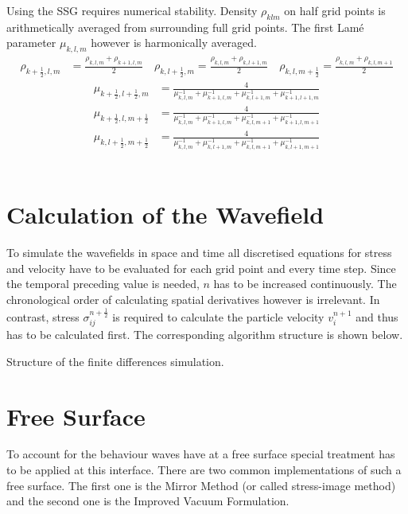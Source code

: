 \documentclass[pdftex,a4paper,parskip,listof=totoc,bibliography=totoc,onehalfspacing,12pt]{scrreprt}
\begin{document}
Using the SSG  requires numerical stability. Density $\rho_{klm}$ on half grid points is arithmetically averaged from surrounding full grid points. The first Lam\'{e} parameter $\mu_{k,l,m}$ however is harmonically averaged. 
\begin{align*}
	\rho_{k+\frac{1}{2},l,m} &= \frac{\rho_{k,l,m} + \rho_{k+1,l,m}}{2} \quad \rho_{k,l+\frac{1}{2},m} = \frac{\rho_{k,l,m} + \rho_{k,l+1,m}}{2} \quad \rho_{k,l,m+\frac{1}{2}} = \frac{\rho_{k,l,m} + \rho_{k,l,m+1}}{2}
\end{align*}
\begin{align*}
	\mu_{k+\frac{1}{2},l+\frac{1}{2},m} &= \frac{4}{\mu^{-1}_{k,l,m} + \mu^{-1}_{k+1,l,m} + \mu^{-1}_{k,l+1,m} + \mu^{-1}_{k+1,l+1,m}}\\
	\mu_{k+\frac{1}{2},l,m+\frac{1}{2}} &= \frac{4}{\mu^{-1}_{k,l,m} + \mu^{-1}_{k+1,l,m} + \mu^{-1}_{k,l,m+1} + \mu^{-1}_{k+1,l,m+1}}\\
	\mu_{k,l+\frac{1}{2},m+\frac{1}{2}} &= \frac{4}{\mu^{-1}_{k,l,m} + \mu^{-1}_{k,l+1,m} + \mu^{-1}_{k,l,m+1} + \mu^{-1}_{k,l+1,m+1}}
\end{align*}
\\

\section{Calculation of the Wavefield}
To simulate the wavefields in space and time all discretised equations for stress and velocity have to be evaluated for each grid point and every time step. Since the temporal preceding value is needed, $n$ has to be increased continuously. The chronological order of calculating spatial derivatives however is irrelevant. In contrast, stress $\sigma_{ij}^{n+\frac{1}{2}}$ is required to calculate the particle velocity $v_i^{n+1}$ and thus has to be calculated first. The corresponding algorithm structure is shown below. 
\begin{algorithm}
\caption{Structure of the finite differences simulation.}
\label{alg:FD}
\end{algorithm}

\section{Free Surface}
\label{sec:FreeSurface}
To account for the behaviour waves have at a free surface special treatment has to be applied at this interface. There are two common implementations of such a free surface. The first one is the Mirror Method (or called stress-image method) and the second one is the Improved Vacuum Formulation.
\end{document}
